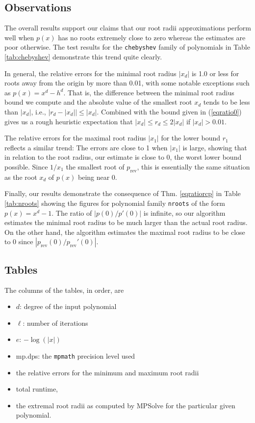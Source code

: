 \documentclass[runningheads]{llncs}
\begin{document}
\subsection{Observations}
The overall results support our claims that our root radii approximations perform well when $p(x)$ has no roots extremely close to zero whereas the estimates are poor otherwise. The test results for the \texttt{chebyshev} family of polynomials in Table \ref{tab:chebyshev} demonstrate this trend quite clearly.

In general, the relative errors for the minimal root radius $|x_d|$ is 1.0 or less for roots away from the origin by more than 0.01, with some notable exceptions such as $p(x)  = x^d - h^d$. That is, the difference between the minimal root radius bound we compute and the absolute value of the smallest root $x_d$ tends to be less than $|x_d|$, i.e., $|r_d - |x_d|| \leq |x_d|$. Combined with the bound given in (\ref{eqratio0}) gives us a rough heuristic expectation that $|x_d| \leq r_d \leq 2|x_d|$ if $|x_d| > 0.01$.

The relative errors for the maximal root radius $|x_1|$ for the lower bound $r_1$ reflects a similar trend: The errors are close to 1 when $|x_1|$ is large, showing that in relation to the root radius, our estimate is close to 0, the worst lower bound possible. Since $1/x_1$ the smallest root of $p_{\text{rev}}$, this is essentially the same situation as the root $x_d$ of $p(x)$ being near 0.

Finally, our results demonstrate the consequence of Thm. \ref{eqratiorcp} in Table \ref{tab:nroots} showing the figures for polynomial family \texttt{nroots} of the form $p(x)  = x^d - 1$. The ratio of $|p(0)/p'(0)|$ is infinite, so our algorithm estimates the minimal root radius to be much larger than the actual root radius. On the other hand, the algorithm estimates the maximal root radius to be close to 0 since $|p_{\text{rev}}(0)/p_{\text{rev}}'(0)|$.

\subsection{Tables}
The columns of the tables, in order, are
\begin{itemize}
\item $d$: degree of the input polynomial
\item $\ell$: number of iterations
\item $e$: $-\log(|x|)$
\item mp.dps: the \texttt{mpmath} precision level used
\item the relative errors for the minimum and maximum root radii
\item total runtime,
\item the extremal root radii as computed by MPSolve for the particular given polynomial.
\end{itemize}
\end{document}
